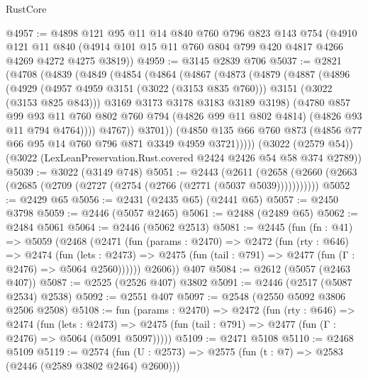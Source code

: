 \begin{lexlean}{RustCore}
\begin{coremodule}
@4957 := @4898
    @121
    @95
    @11
    @14
    @840
    @760
    @796
    @823
    @143
    @754
    (@4910
      @121
      @11
      @840
      (@4914 @101 @15 @11 @760 @804 @799 @420 @4817 @4266 @4269 @4272 @4275 @3819))
@4959 := @3145 @2839 @706
@5037 := @2821
    (@4708
      (@4839
        (@4849
          (@4854
            (@4864
              (@4867
                (@4873
                  (@4879
                    (@4887
                      (@4896
                        (@4929
                          (@4957 @4959 @3151 (@3022 (@3153 @835 @760)))
                          @3151
                          (@3022 (@3153 @825 @843)))
                        @3169
                        @3173
                        @3178
                        @3183
                        @3189
                        @3198)
                      (@4780
                        @857
                        @99
                        @93
                        @11
                        @760
                        @802
                        @760
                        @794
                        (@4826 @99 @11 @802 @4814)
                        (@4826 @93 @11 @794 @4764))))
                  @4767))
              @3701))
          (@4850 @135 @66 @760 @873 (@4856 @77 @66 @95 @14 @760 @796 @871 @3349 @4959 @3721)))))
    (@3022 (@2579 @54))
    (@3022 (LexLeanPreservation.Rust.covered @2424 @2426 @54 @58 @374 @2789))
@5039 := @3022 (@3149 @748)
@5051 := @2443
    (@2611 (@2658 (@2660 (@2663 (@2685 (@2709 (@2727 (@2754 (@2766 (@2771 (@5037 @5039)))))))))))
@5052 := @2429 @65
@5056 := @2431 (@2435 @65) (@2441 @65)
@5057 := @2450 @3798
@5059 := @2446 (@5057 @2465)
@5061 := @2488 (@2489 @65)
@5062 := @2484 @5061
@5064 := @2446 (@5062 @2513)
@5081 := @2445
    (fun (fn : @41) =>
    @5059
      (@2468
        (@2471
          (fun (params : @2470) =>
          @2472
            (fun (rty : @646) =>
            @2474
              (fun (lets : @2473) =>
              @2475 (fun (tail : @791) => @2477 (fun (Γ : @2476) => @5064 @2560))))))
        @2606))
    @407
@5084 := @2612 (@5057 (@2463 @407))
@5087 := @2525 (@2526 @407) @3802
@5091 := @2446 (@2517 (@5087 @2534) @2538)
@5092 := @2551 @407
@5097 := @2548 (@2550 @5092 @3806 @2506 @2508)
@5108 := fun (params : @2470) =>
  @2472
    (fun (rty : @646) =>
    @2474
      (fun (lets : @2473) =>
      @2475 (fun (tail : @791) => @2477 (fun (Γ : @2476) => @5064 (@5091 @5097)))))
@5109 := @2471 @5108
@5110 := @2468 @5109
@5119 := @2574 (fun (U : @2573) => @2575 (fun (t : @7) => @2583 (@2446 (@2589 @3802 @2464) @2600)))

\end{coremodule}
\end{lexlean}
